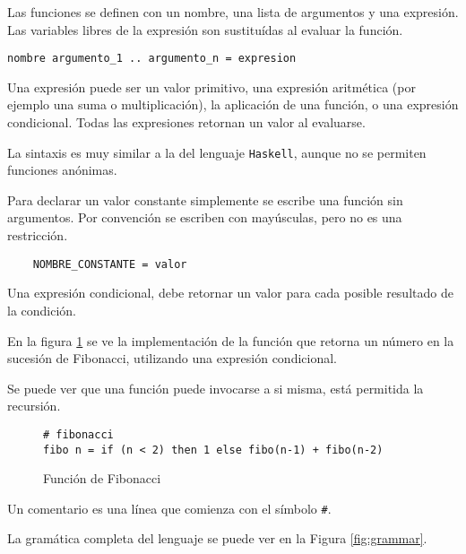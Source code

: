 
  Las funciones se definen con un nombre, una lista de argumentos y una 
expresión. Las variables libres de la expresión son sustituídas al evaluar
la función.

\begin{verbatim}
nombre argumento_1 .. argumento_n = expresion
\end{verbatim}

  Una expresión puede ser un valor primitivo,
una expresión aritmética (por ejemplo una suma o multiplicación),
la aplicación de una función, o una expresión condicional.
  Todas las expresiones retornan un valor al evaluarse.

  La sintaxis es muy similar a la del lenguaje \texttt{Haskell}, aunque
no se permiten funciones anónimas.

  Para declarar un valor constante simplemente se escribe una función sin
argumentos. Por convención se escriben con mayúsculas, pero no es una
restricción.

\begin{verbatim}
    NOMBRE_CONSTANTE = valor
\end{verbatim}

  Una expresión condicional, debe retornar un valor para cada posible
resultado de la condición.

  En la figura \ref{fig:fibo} se ve la implementación
de la función que retorna un número en la sucesión de Fibonacci,
utilizando una expresión condicional.

  Se puede ver que una función puede invocarse a si misma, está permitida
la recursión.

\begin{figure}
\begin{center}
  \caption{Función de Fibonacci}
  \begin{Verbatim}[frame=single]
# fibonacci
fibo n = if (n < 2) then 1 else fibo(n-1) + fibo(n-2)
  \end{Verbatim}
   \label{fig:fibo}
\end{center}
\end{figure}

Un comentario es una línea que comienza con el símbolo \texttt{\#}.

La gramática completa del lenguaje se puede ver en la Figura \ref{fig:grammar}.
